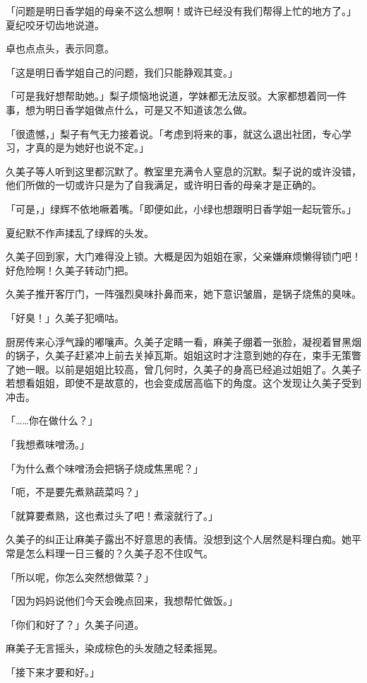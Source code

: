 \documentclass[UTF8]{ctexart}
\begin{document}
    「问题是明日香学姐的母亲不这么想啊！或许已经没有我们帮得上忙的地方了。」夏纪咬牙切齿地说道。 

    卓也点点头，表示同意。 

    「这是明日香学姐自己的问题，我们只能静观其变。」 

    「可是我好想帮助她。」梨子烦恼地说道，学妹都无法反驳。大家都想着同一件事，想为明日香学姐做点什么，可是又不知道该怎么做。 

    「很遗憾，」梨子有气无力接着说。「考虑到将来的事，就这么退出社团，专心学习，才真的是为她好也说不定。」 

    久美子等人听到这里都沉默了。教室里充满令人窒息的沉默。梨子说的或许没错，他们所做的一切或许只是为了自我满足，或许明日香的母亲才是正确的。 

    「可是，」绿辉不依地噘着嘴。「即便如此，小绿也想跟明日香学姐一起玩管乐。」 

    夏纪默不作声揉乱了绿辉的头发。 

    久美子回到家，大门难得没上锁。大概是因为姐姐在家，父亲嫌麻烦懒得锁门吧！好危险啊！久美子转动门把。 

    久美子推开客厅门，一阵强烈臭味扑鼻而来，她下意识皱眉，是锅子烧焦的臭味。 

    「好臭！」久美子犯嘀咕。 

    厨房传来心浮气躁的嘟嚷声。久美子定睛一看，麻美子绷着一张脸，凝视着冒黑烟的锅子，久美子赶紧冲上前去关掉瓦斯。姐姐这时才注意到她的存在，束手无策瞥了她一眼。以前是姐姐比较高，曾几何时，久美子的身高已经追过姐姐了。久美子若想看姐姐，即使不是故意的，也会变成居高临下的角度。这个发现让久美子受到冲击。 

    「……你在做什么？」 

    「我想煮味噌汤。」 

    「为什么煮个味噌汤会把锅子烧成焦黑呢？」 

    「呃，不是要先煮熟蔬菜吗？」 

    「就算要煮熟，这也煮过头了吧！煮滚就行了。」 

    久美子的纠正让麻美子露出不好意思的表情。没想到这个人居然是料理白痴。她平常是怎么料理一日三餐的？久美子忍不住叹气。 

    「所以呢，你怎么突然想做菜？」 

    「因为妈妈说他们今天会晚点回来，我想帮忙做饭。」 

    「你们和好了？」久美子问道。 

    麻美子无言摇头，染成棕色的头发随之轻柔摇晃。 

    「接下来才要和好。」 
\end{document}
